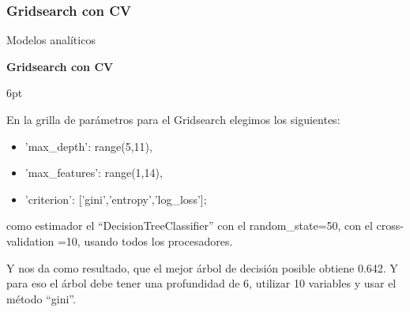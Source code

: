 \documentclass[pdf]{beamer}
\def\vspace{}%
\begin{document}
\subsubsection{Gridsearch con CV}

\begin{frame}{Modelos analíticos}

    \begin{Large}
        \textbf{Gridsearch con CV}
    \end{Large}
    \vspace{6pt}
    
    En la grilla de parámetros para el Gridsearch elegimos los siguientes:
    \begin{itemize}
        \item 'max\_depth': range(5,11),
        \item 'max\_features': range(1,14),
        \item 'criterion': ['gini','entropy','log\_loss'];
    \end{itemize}
    como estimador el ``DecisionTreeClassifier'' con el random\_state=50, con el cross-validation =10,  usando todos los procesadores.

    Y nos da como resultado, que el mejor árbol de decisión posible obtiene 0.642. Y para eso el árbol debe tener una profundidad de  6, utilizar  10  variables y usar el método ``gini''.

\end{frame}
\end{document}
